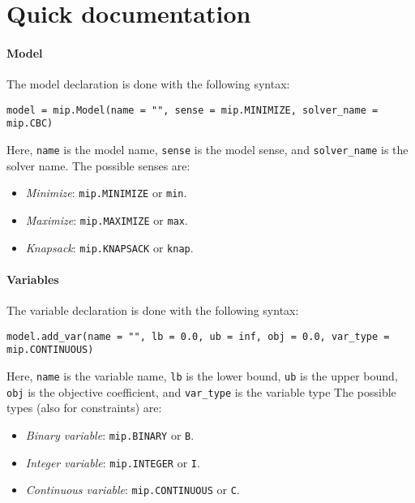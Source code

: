 \section{Quick documentation}

\paragraph*{Model}
The model declaration is done with the following syntax: 
\begin{lstlisting}[style=Python]
model = mip.Model(name = "", sense = mip.MINIMIZE, solver_name = mip.CBC)
\end{lstlisting}
Here, \texttt{name} is the model name, \texttt{sense} is the model sense, and \texttt{solver\_name} is the solver name. 
The possible senses are: 
\begin{itemize}
  \item \textit{Minimize}: \texttt{mip.MINIMIZE} or \texttt{min}.
  \item \textit{Maximize}: \texttt{mip.MAXIMIZE} or \texttt{max}.
  \item \textit{Knapsack}: \texttt{mip.KNAPSACK} or \texttt{knap}.
\end{itemize}

\paragraph*{Variables}
The variable declaration is done with the following syntax: 
\begin{lstlisting}[style=Python]
model.add_var(name = "", lb = 0.0, ub = inf, obj = 0.0, var_type = mip.CONTINUOUS)
\end{lstlisting}
Here, \texttt{name} is the variable name, \texttt{lb} is the lower bound, \texttt{ub} is the upper bound, \texttt{obj} is the objective coefficient, and \texttt{var\_type} is the variable type
The possible types (also for constraints) are: 
\begin{itemize}
    \item \textit{Binary variable}: \texttt{mip.BINARY} or \texttt{B}.
    \item \textit{Integer variable}: \texttt{mip.INTEGER} or \texttt{I}.
    \item \textit{Continuous variable}: \texttt{mip.CONTINUOUS} or \texttt{C}.
\end{itemize}

